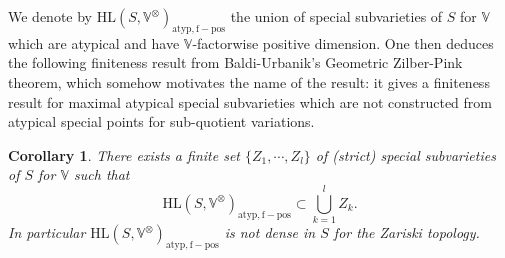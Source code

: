 \documentclass[10pt]{article}
\numberwithin{equation}{subsection}
\theoremstyle{plain}
\newtheorem{corollary}[theorem]{Corollary}
\theoremstyle{definition}
\theoremstyle{remark}
\newcommand{\V}{\mathbb V}
\newcommand{\HL}{\mathrm{HL}(S, \V^\otimes)}
\begin{document}
We denote by $\HL_{\mathrm{atyp}, \mathrm{f-pos}}$ the union of special subvarieties of $S$ for $\V$ which are atypical and have $\V$-factorwise positive dimension. One then deduces the following finiteness result from Baldi-Urbanik's Geometric Zilber-Pink theorem, which somehow motivates the name of the result: it gives a finiteness result for maximal atypical special subvarieties which are not constructed from atypical special points for sub-quotient variations.
\begin{corollary}\label{zpcor}
There exists a finite set $\{Z_1, \cdots, Z_l\}$ of (strict) special subvarieties of $S$ for $\V$ such that 
\[
\HL_{\mathrm{atyp}, \mathrm{f-pos}} \subset \bigcup_{k = 1}^l Z_k.
\]
In particular $\HL_{\mathrm{atyp}, \mathrm{f-pos}}$ is not dense in $S$ for the Zariski topology.
\end{corollary}
\end{document}
